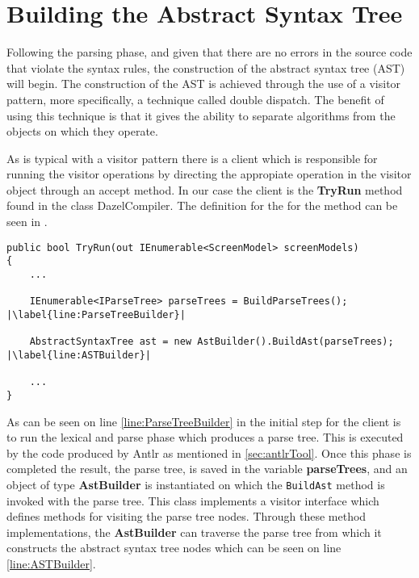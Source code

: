 \section{Building the Abstract Syntax Tree} \label{sec:buildASTSection}

Following the parsing phase, and given that there are no errors in the source code that violate the syntax rules, the construction of the abstract syntax tree (AST) will begin. The construction of the AST is achieved through the use of a visitor pattern, more specifically, a technique called double dispatch. The benefit of using this technique is that it gives the ability to separate algorithms from the objects on which they operate\cite{VisitorGuru}. 

As is typical with a visitor pattern there is a client which is responsible for running the visitor operations by directing the appropiate operation in the visitor object through an accept method. In our case the client is the \textbf{TryRun} method found in the class DazelCompiler. The definition for the for the method can be seen in .

\begin{lstlisting}[language=CSharp, caption={The Run method that serves as a client inside the DazelCompiler class}, label={lst:RunMethod},escapechar=|]
public bool TryRun(out IEnumerable<ScreenModel> screenModels)
{
    ...

    IEnumerable<IParseTree> parseTrees = BuildParseTrees(); |\label{line:ParseTreeBuilder}|

    AbstractSyntaxTree ast = new AstBuilder().BuildAst(parseTrees); |\label{line:ASTBuilder}|

    ...
}
\end{lstlisting}

As can be seen on line \ref{line:ParseTreeBuilder} in  the initial step for the client is to run the lexical and parse phase which produces a parse tree. This is executed by the code produced by Antlr as mentioned in \ref{sec:antlrTool}. Once this phase is completed the result, the parse tree, is saved in the variable \textbf{parseTrees}, and an object of type \textbf{AstBuilder} is instantiated on which the \texttt{BuildAst} method is invoked with the parse tree. This class implements a visitor interface which defines methods for visiting the parse tree nodes. Through these method implementations, the \textbf{AstBuilder} can traverse the parse tree from which it constructs the abstract syntax tree nodes which can be seen on line \ref{line:ASTBuilder}. 

